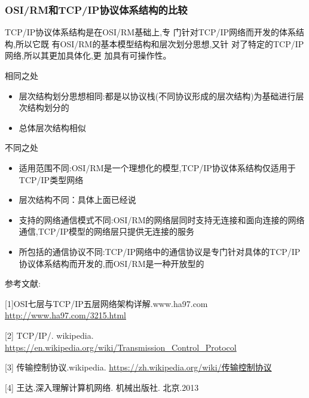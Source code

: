 \documentclass[11pt]{ctexart} %
\begin{document}
\subsubsection*{OSI/RM和TCP/IP协议体系结构的比较}
  TCP/IP协议体系结构是在OSI/RM基础上,专
门针对TCP/IP网络而开发的体系结构,所以它既
有OSI/RM的基本模型结构和层次划分思想,又针
对了特定的TCP/IP网络,所以其更加具体化,更
加具有可操作性。

相同之处
\begin{itemize}
\item 层次结构划分思想相同:都是以协议栈(不同协议形成的层次结构)为基础进行层次结构划分的
\item 总体层次结构相似
\end{itemize}

不同之处
\begin{itemize}
\item 适用范围不同:OSI/RM是一个理想化的模型,TCP/IP协议体系结构仅适用于TCP/IP类型网络
\item 层次结构不同：具体上面已经说
\item 支持的网络通信模式不同:OSI/RM的网络层同时支持无连接和面向连接的网络通信,TCP/IP模型的网络层只提供无连接的服务
\item 所包括的通信协议不同:TCP/IP网络中的通信协议是专门针对具体的TCP/IP协议体系结构而开发的,而OSI/RM是一种开放型的
\end{itemize}


参考文献:

[1]OSI七层与TCP/IP五层网络架构详解.www.ha97.com  \url{ http://www.ha97.com/3215.html} 

[2] TCP/IP/. wikipedia. \url{https://en.wikipedia.org/wiki/Transmission_Control_Protocol}

[3] 传输控制协议.wikipedia.  \url{https://zh.wikipedia.org/wiki/传输控制协议}

[4] 王达.深入理解计算机网络. 机械出版社. 北京.2013
\end{document}
